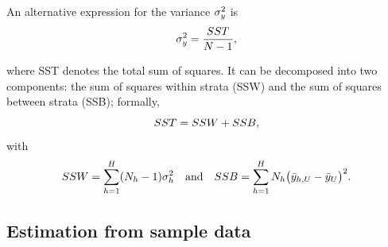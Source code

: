 \documentclass{my_eth_beamer}
\numberwithin{equation}{section}
\begin{document}
\begin{frame}
    \begin{Exkurs}\label{exkurs:strat_anova}
        \vspace{-0.5em}
        An alternative expression for the variance ${\sigma_y^2}$ is
        \begin{equation*}
            {\ensuremath{\sigma_y^2}} = \frac{SST}{N - 1},
        \end{equation*}

        \noindent where \alert{SST} denotes the total sum of squares. It can be
        decomposed into two components: the sum of squares within strata
        (\alert{SSW}) and the sum of squares between strata (\alert{SSB});
        formally,
        \begin{equation*}
            SST = SSW + SSB,
        \end{equation*}
        \noindent with
        \begin{equation*}
            SSW = \sum_{h = 1}^H (N_{h} - 1) \sigma_{h}^2 \quad \text{and} \quad
                SSB = \sum_{h = 1}^H N_{h} \big(\bar{y}_{h,U} -\bar{y}_U \big)^2.
        \end{equation*}
        \vspace{0.25em}
    \end{Exkurs}
\end{frame}

\subsection{Estimation from sample data}
\end{document}
